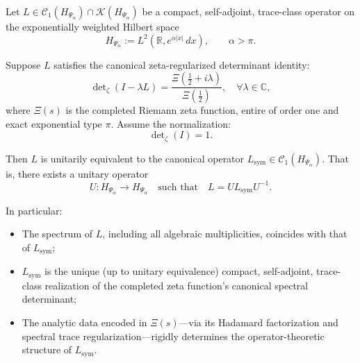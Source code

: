 \begin{theorem}
\label{thm:uniqueness_realization}

Let \( L \in \mathcal{C}_1(H_{\Psi_\alpha}) \cap \mathcal{K}(H_{\Psi_\alpha}) \) be a compact, self-adjoint, trace-class operator on the exponentially weighted Hilbert space
\[
H_{\Psi_\alpha} := L^2(\mathbb{R}, e^{\alpha |x|} \, dx), \qquad \alpha > \pi.
\]

Suppose \( L \) satisfies the canonical zeta-regularized determinant identity:
\[
\det\nolimits_\zeta(I - \lambda L) = \frac{\Xi\left( \tfrac{1}{2} + i\lambda \right)}{\Xi\left( \tfrac{1}{2} \right)},
\quad \forall \lambda \in \mathbb{C},
\]
where \( \Xi(s) \) is the completed Riemann zeta function, entire of order one and exact exponential type \( \pi \). Assume the normalization:
\[
\det\nolimits_\zeta(I) = 1.
\]

Then \( L \) is unitarily equivalent to the canonical operator \( L_{\mathrm{sym}} \in \mathcal{C}_1(H_{\Psi_\alpha}) \). That is, there exists a unitary operator
\[
U \colon H_{\Psi_\alpha} \to H_{\Psi_\alpha} \quad \text{such that} \quad L = U L_{\mathrm{sym}} U^{-1}.
\]

\medskip
\noindent
In particular:
\begin{itemize}
  \item The spectrum of \( L \), including all algebraic multiplicities, coincides with that of \( L_{\mathrm{sym}} \);
  \item \( L_{\mathrm{sym}} \) is the unique (up to unitary equivalence) compact, self-adjoint, trace-class realization of the completed zeta function’s canonical spectral determinant;
  \item The analytic data encoded in \( \Xi(s) \)—via its Hadamard factorization and spectral trace regularization—rigidly determines the operator-theoretic structure of \( L_{\mathrm{sym}} \).
\end{itemize}
\end{theorem}
